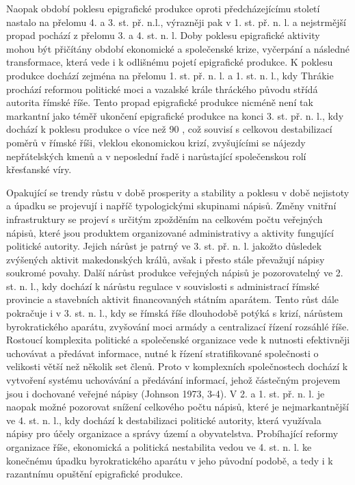 Naopak období poklesu epigrafické produkce oproti předcházejícímu století nastalo na přelomu 4. a 3. st. př. n.l., výrazněji pak v 1. st. př. n. l. a nejstrmější propad pochází z přelomu 3. a 4. st. n. l. Doby poklesu epigrafické aktivity mohou být přičítány období ekonomické a společenské krize, vyčerpání a následné transformace, která vede i k odlišnému pojetí epigrafické produkce. K poklesu produkce dochází zejména na přelomu 1. st. př. n. l. a 1. st. n. l., kdy Thrákie prochází reformou politické moci a vazalské krále thráckého původu střídá autorita římské říše. Tento propad epigrafické produkce nicméně není tak markantní jako téměř ukončení epigrafické produkce na konci 3. st. př. n. l., kdy dochází k poklesu produkce o více než 90 , což souvisí s celkovou destabilizací poměrů v římské říši, vleklou ekonomickou krizí, zvyšujícími se nájezdy nepřátelských kmenů a v neposlední řadě i narůstající společenskou rolí křesťanské víry.

Opakující se trendy růstu v době prosperity a stability a poklesu v době nejistoty a úpadku se projevují i napříč typologickými skupinami nápisů. Změny vnitřní infrastruktury se projeví s určitým zpožděním na celkovém počtu veřejných nápisů, které jsou produktem organizované administrativy a aktivity fungující politické autority. Jejich nárůst je patrný ve 3. st. př. n. l. jakožto důsledek zvýšených aktivit makedonských králů, avšak i přesto stále převažují nápisy soukromé povahy. Další nárůst produkce veřejných nápisů je pozorovatelný ve 2. st. n. l., kdy dochází k nárůstu regulace v souvislosti s administrací římské provincie a stavebních aktivit financovaných státním aparátem. Tento růst dále pokračuje i v 3. st. n. l., kdy se římská říše dlouhodobě potýká s krizí, nárůstem byrokratického aparátu, zvyšování moci armády a centralizací řízení rozsáhlé říše. Rostoucí komplexita politické a společenské organizace vede k nutnosti efektivněji uchovávat a předávat informace, nutné k řízení stratifikované společnosti o velikosti větší než několik set členů. Proto v komplexních společnostech dochází k vytvoření systému uchovávání a předávání informací, jehož částečným projevem jsou i dochované veřejné nápisy (Johnson 1973, 3-4). V 2. a 1. st. př. n. l. je naopak možné pozorovat snížení celkového počtu nápisů, které je nejmarkantnější ve 4. st. n. l., kdy dochází k destabilizaci politické autority, která využívala nápisy pro účely organizace a správy území a obyvatelstva. Probíhající reformy organizace říše, ekonomická a politická nestabilita vedou ve 4. st. n. l. ke konečnému úpadku byrokratického aparátu v jeho původní podobě, a tedy i k razantnímu opuštění epigrafické produkce.

